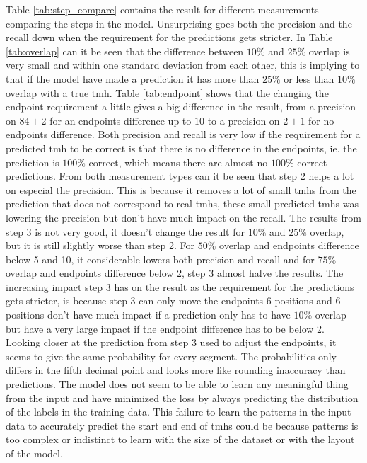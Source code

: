 Table \ref{tab:step_compare} contains the result for different measurements 
comparing the steps in the model. Unsurprising goes both the precision and the 
recall down when the requirement for the predictions gets stricter. In 
Table \ref{tab:overlap} can it be seen that the difference between $10\%$ and $25\%$
overlap is very small and within one standard deviation from each other, 
this is implying to that if the model have made a prediction it has more than 
$25\%$ or less than $10\%$ overlap with a true \gls{tmh}.
Table \ref{tab:endpoint} shows that the changing the endpoint requirement a little 
gives a big difference in the result, from a precision on $84 \pm 2$ for an endpoints 
difference up to $10$ to a precision on $2 \pm 1$ for no endpoints difference.
Both precision and recall is very low if the requirement for a predicted \gls{tmh}
to be correct is that there is no difference in the endpoints, ie. the prediction 
is $100\%$ correct, which means there are almost no $100\%$ correct predictions.
From both measurement types can it be seen that step 2 helps a lot on especial 
the precision. This is because it removes a lot of small \glspl{tmh} from the 
prediction that does not correspond to real \glspl{tmh}, these small predicted 
\glspl{tmh} was lowering the precision but don't have much impact on the recall.
The results from step 3 is not very good, it doesn't change the result for 
$10\%$ and $25\%$ overlap, but it is still slightly worse than step 2. 
For $50\%$ overlap and endpoints difference below 5 and 10, it considerable lowers
both precision and recall and for $75\%$ overlap and endpoints difference below 
2, step 3 almost halve the results. The increasing impact step 3 has on the 
result as the requirement for the predictions gets stricter, is because step 3 
can only move the endpoints 6 positions and 6 positions don't have much impact 
if a prediction only has to have $10\%$ overlap but have a very large impact 
if the endpoint difference has to be below 2. 
Looking closer at the prediction from step 3 used to adjust the endpoints, it 
seems to give the same probability for every segment. The probabilities only
differs in the fifth decimal point and looks more like rounding inaccuracy
than predictions. The model does not seem to be able to learn any meaningful
thing from the input and have minimized the loss by always predicting the 
distribution of the labels in the training data. 
This failure to learn the patterns in the input data to accurately predict
the start end end of \glspl{tmh} could be because patterns is too complex or 
indistinct to learn with the size of the dataset or with the layout of the 
model.

